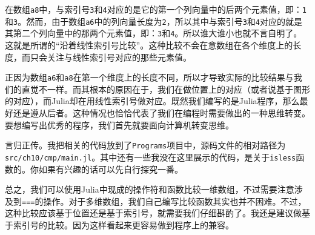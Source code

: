 在数组\verb|a8|中，与索引号\verb|3|和\verb|4|对应的是它的第一个列向量中的后两个元素值，即：\verb|1|和\verb|3|。然而，由于数组\verb|a6|中的列向量长度为\verb|2|，所以其中与索引号\verb|3|和\verb|4|对应的就是其第二个列向量中的那两个元素值，即：\verb|3|和\verb|4|。所以谁大谁小也就不言自明了。这就是所谓的“沿着线性索引号比较”。这种比较不会在意数组在各个维度上的长度，而只会关注与线性索引号对应的那些元素值。

正因为数组\verb|a6|和\verb|a8|在第一个维度上的长度不同，所以才导致实际的比较结果与我们的直觉不一样。而其根本的原因在于，我们在做位置上的对应（或者说基于图形的对应），而Julia却在用线性索引号做对应。既然我们编写的是Julia程序，那么最好还是遵从后者。这种情况也恰恰代表了我们在编程时需要做出的一种思维转变。要想编写出优秀的程序，我们首先就要面向计算机转变思维。

言归正传。我把相关的代码放到了\verb|Programs|项目中，源码文件的相对路径为\verb|src/ch10/cmp/main.jl|。其中还有一些我没在这里展示的代码，是关于\verb|isless|函数的。你如果有兴趣的话可以先自行探究一番。

总之，我们可以使用Julia中现成的操作符和函数比较一维数组，不过需要注意涉及到\verb|===|的操作。对于多维数组，我们自己编写比较函数其实也并不困难。不过，这种比较应该基于位置还是基于索引号，就需要我们仔细斟酌了。我还是建议做基于索引号的比较。因为这样看起来更容易做到程序上的兼容。